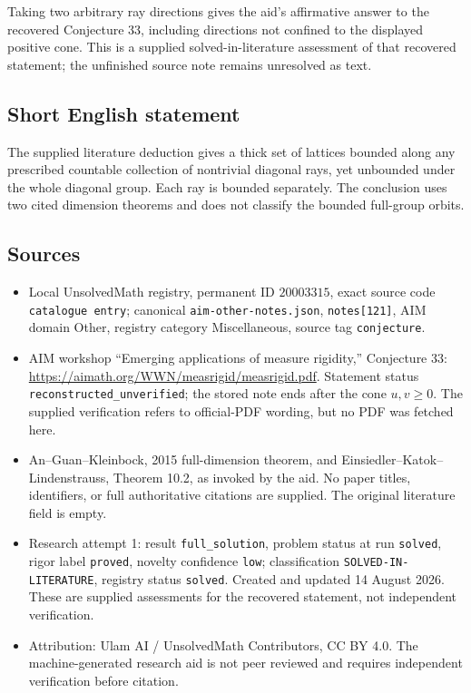 \documentclass[11pt]{article}
\begin{document}
Taking two arbitrary ray directions gives the aid's affirmative answer to the recovered Conjecture 33, including directions not confined to the displayed positive cone. This is a supplied solved-in-literature assessment of that recovered statement; the unfinished source note remains unresolved as text.
\subsection{Short English statement}
The supplied literature deduction gives a thick set of lattices bounded along any prescribed countable collection of nontrivial diagonal rays, yet unbounded under the whole diagonal group. Each ray is bounded separately. The conclusion uses two cited dimension theorems and does not classify the bounded full-group orbits.
\subsection{Sources}
\begin{itemize}
\item Local UnsolvedMath registry, permanent ID \(20003315\), exact source code \texttt{catalogue entry}; canonical \texttt{aim-other-notes.json}, \texttt{notes[121]}, AIM domain Other, registry category Miscellaneous, source tag \texttt{conjecture}.
\item AIM workshop ``Emerging applications of measure rigidity,'' Conjecture 33: \url{https://aimath.org/WWN/measrigid/measrigid.pdf}. Statement status \texttt{reconstructed\_unverified}; the stored note ends after the cone \(u,v\geq0\). The supplied verification refers to official-PDF wording, but no PDF was fetched here.
\item An--Guan--Kleinbock, 2015 full-dimension theorem, and Einsiedler--Katok--Lindenstrauss, Theorem 10.2, as invoked by the aid. No paper titles, identifiers, or full authoritative citations are supplied. The original literature field is empty.
\item Research attempt 1: result \texttt{full\_solution}, problem status at run \texttt{solved}, rigor label \texttt{proved}, novelty confidence \texttt{low}; classification \texttt{SOLVED-IN-LITERATURE}, registry status \texttt{solved}. Created and updated 14 August 2026. These are supplied assessments for the recovered statement, not independent verification.
\item Attribution: Ulam AI / UnsolvedMath Contributors, CC BY 4.0. The machine-generated research aid is not peer reviewed and requires independent verification before citation.
\end{itemize}
\end{document}

